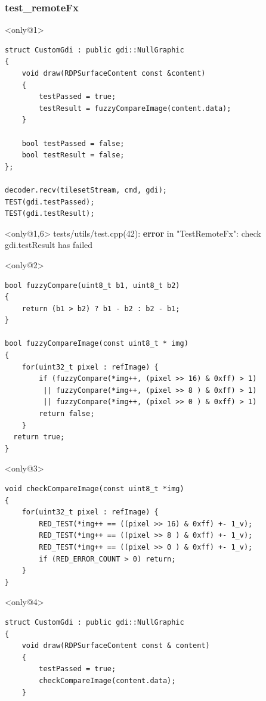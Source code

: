 \documentclass{beamer}
\begin{document}
\begin{frame}[fragile]
\frametitle{test\_remoteFx}
\begin{exampleblock}{}<only@1>
\begin{lstlisting}
struct CustomGdi : public gdi::NullGraphic
{
    void draw(RDPSurfaceContent const &content)
    {
        testPassed = true;
        testResult = fuzzyCompareImage(content.data);
    }

    bool testPassed = false;
    bool testResult = false;
};

decoder.recv(tilesetStream, cmd, gdi);
TEST(gdi.testPassed);
TEST(gdi.testResult);
\end{lstlisting}
\end{exampleblock}

\begin{exampleblock}{}<only@1,6>
{\color{f7}tests/utils/test.cpp(42)}: \textbf{\color{f1}error} in "{\color{f5}TestRemoteFx}":
 {\color{f4}check} {\color{f1}gdi.testResult} has failed
\end{exampleblock}

\begin{exampleblock}{}<only@2>
\begin{lstlisting}
bool fuzzyCompare(uint8_t b1, uint8_t b2)
{
    return (b1 > b2) ? b1 - b2 : b2 - b1;
}

bool fuzzyCompareImage(const uint8_t * img)
{
    for(uint32_t pixel : refImage) {
        if (fuzzyCompare(*img++, (pixel >> 16) & 0xff) > 1)
         || fuzzyCompare(*img++, (pixel >> 8 ) & 0xff) > 1)
         || fuzzyCompare(*img++, (pixel >> 0 ) & 0xff) > 1)
        return false;
    }
  return true;
}
\end{lstlisting}
\end{exampleblock}

\begin{exampleblock}{}<only@3>
\begin{lstlisting}
void checkCompareImage(const uint8_t *img)
{
    for(uint32_t pixel : refImage) {
        RED_TEST(*img++ == ((pixel >> 16) & 0xff) +- 1_v);
        RED_TEST(*img++ == ((pixel >> 8 ) & 0xff) +- 1_v);
        RED_TEST(*img++ == ((pixel >> 0 ) & 0xff) +- 1_v);
        if (RED_ERROR_COUNT > 0) return;
    }
}
\end{lstlisting}
\end{exampleblock}

\begin{exampleblock}{}<only@4>
\begin{lstlisting}
struct CustomGdi : public gdi::NullGraphic
{
    void draw(RDPSurfaceContent const & content)
    {
        testPassed = true;
        checkCompareImage(content.data);
    }


\end{lstlisting}
\end{exampleblock}
\end{frame}
\end{document}
